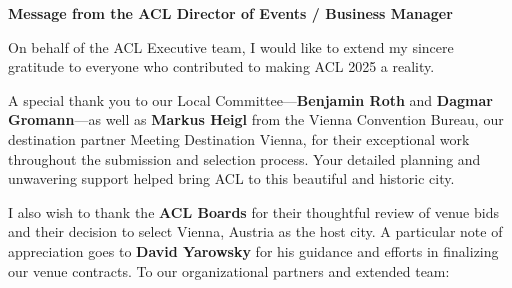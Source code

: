 \textbf{Message from the ACL Director of Events / Business Manager}

On behalf of the ACL Executive team, I would like to extend my sincere gratitude to everyone who contributed to making ACL 2025 a reality.

A special thank you to our Local Committee—\textbf{Benjamin Roth} and \textbf{Dagmar Gromann}—as well as \textbf{Markus Heigl} from the Vienna Convention Bureau, our destination partner Meeting Destination Vienna, for their exceptional work throughout the submission and selection process. Your detailed planning and unwavering support helped bring ACL to this beautiful and historic city.

I also wish to thank the \textbf{ACL Boards} for their thoughtful review of venue bids and their decision to select Vienna, Austria as the host city. A particular note of appreciation goes to \textbf{David Yarowsky} for his guidance and efforts in finalizing our venue contracts.
To our organizational partners and extended team:

